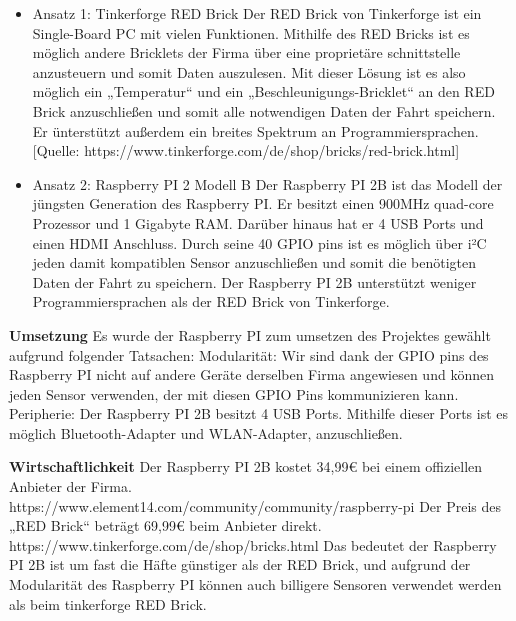 \begin{itemize}
\item Ansatz 1: Tinkerforge RED Brick
Der RED Brick von Tinkerforge ist ein Single-Board PC mit vielen Funktionen.
Mithilfe des RED Bricks ist es möglich andere Bricklets der Firma über eine proprietäre schnittstelle anzusteuern und somit Daten auszulesen.
Mit dieser Lösung ist es also möglich ein „Temperatur“ und ein „Beschleunigungs-Bricklet“ an den RED Brick anzuschließen und somit alle notwendigen Daten der Fahrt speichern.
Er ünterstützt außerdem ein breites Spektrum an Programmiersprachen.
[Quelle: https://www.tinkerforge.com/de/shop/bricks/red-brick.html]

\item Ansatz 2: Raspberry PI 2 Modell B
Der Raspberry PI 2B ist das Modell der jüngsten Generation des Raspberry PI. Er besitzt einen 900MHz quad-core Prozessor und 1 Gigabyte RAM. Darüber hinaus hat er 4 USB Ports und einen HDMI Anschluss. Durch seine 40 GPIO pins ist es möglich über i²C jeden damit kompatiblen Sensor anzuschließen und somit die benötigten Daten der Fahrt zu speichern.
Der Raspberry PI 2B unterstützt weniger Programmiersprachen als der RED Brick von Tinkerforge.
\end{itemize}

\textbf{Umsetzung\newline}
Es wurde der Raspberry PI zum umsetzen des Projektes gewählt aufgrund folgender Tatsachen:
Modularität:
Wir sind dank der GPIO pins des Raspberry PI nicht auf andere Geräte derselben Firma angewiesen und können jeden Sensor verwenden, der mit diesen GPIO Pins kommunizieren kann.
Peripherie:
Der Raspberry PI 2B besitzt 4 USB Ports. Mithilfe dieser Ports ist es möglich Bluetooth-Adapter und WLAN-Adapter, anzuschließen.

\textbf{Wirtschaftlichkeit\newline}
Der Raspberry PI 2B kostet 34,99€ bei einem offiziellen Anbieter der Firma.
https://www.element14.com/community/community/raspberry-pi
Der Preis des „RED Brick“ beträgt 69,99€ beim Anbieter direkt.
https://www.tinkerforge.com/de/shop/bricks.html
Das bedeutet der Raspberry PI 2B ist um fast die Häfte günstiger als der RED Brick, und aufgrund der
Modularität des Raspberry PI können auch billigere Sensoren verwendet werden als beim tinkerforge
RED Brick.

